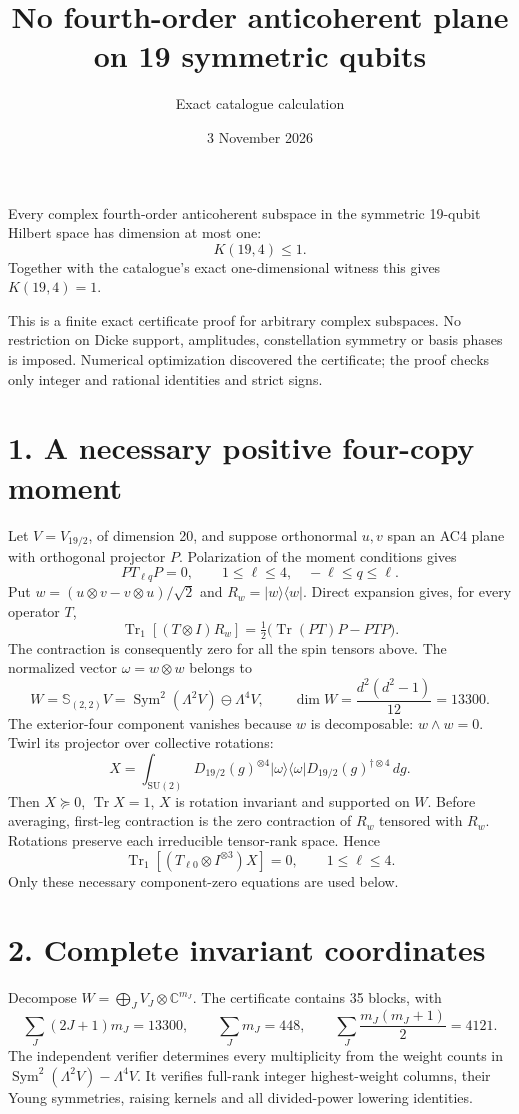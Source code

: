\documentclass[11pt]{article}
\newcommand{\Tr}{\operatorname{Tr}}\newcommand{\Sym}{\operatorname{Sym}}
\begin{document}
\title{No fourth-order anticoherent plane on 19 symmetric qubits}
\author{Exact catalogue calculation}\date{3 November 2026}\maketitle
\begin{theorem}
Every complex fourth-order anticoherent subspace in the symmetric 19-qubit Hilbert space has dimension at most one:
\[\boxed{K(19,4)\le1.}\]
Together with the catalogue's exact one-dimensional witness this gives $K(19,4)=1$.
\end{theorem}
This is a finite exact certificate proof for arbitrary complex subspaces. No restriction on Dicke support, amplitudes, constellation symmetry or basis phases is imposed. Numerical optimization discovered the certificate; the proof checks only integer and rational identities and strict signs.

\section*{1. A necessary positive four-copy moment}
Let $V=V_{19/2}$, of dimension 20, and suppose orthonormal $u,v$ span an AC4 plane with orthogonal projector $P$. Polarization of the moment conditions gives
\[PT_{\ell q}P=0,\qquad 1\le\ell\le4,\quad -\ell\le q\le\ell.\]
Put $w=(u\otimes v-v\otimes u)/\sqrt2$ and $R_w=|w\rangle\langle w|$. Direct expansion gives, for every operator $T$,
\[\Tr_1[(T\otimes I)R_w]=\tfrac12\bigl(\Tr(PT)P-PTP\bigr).\]
The contraction is consequently zero for all the spin tensors above. The normalized vector $\omega=w\otimes w$ belongs to
\[W=\mathbb S_{(2,2)}V=\Sym^2(\Lambda^2V)\ominus\Lambda^4V,\qquad \dim W=\frac{d^2(d^2-1)}{12}=13300.\]
The exterior-four component vanishes because $w$ is decomposable: $w\wedge w=0$. Twirl its projector over collective rotations:
\[X=\int_{\mathrm{SU}(2)}D_{19/2}(g)^{\otimes4}|\omega\rangle\langle\omega|D_{19/2}(g)^{\dagger\otimes4}\,dg.\]
Then $X\succeq0$, $\Tr X=1$, $X$ is rotation invariant and supported on $W$. Before averaging, first-leg contraction is the zero contraction of $R_w$ tensored with $R_w$. Rotations preserve each irreducible tensor-rank space. Hence
\begin{equation}\label{eq:zero}\Tr_1[(T_{\ell0}\otimes I^{\otimes3})X]=0,\qquad1\le\ell\le4.\end{equation}
Only these necessary component-zero equations are used below.

\section*{2. Complete invariant coordinates}
Decompose $W=\bigoplus_J V_J\otimes\mathbb C^{m_J}$. The certificate contains 35 blocks, with
\[\sum_J(2J+1)m_J=13300,\qquad\sum_Jm_J=448,\qquad\sum_J\frac{m_J(m_J+1)}2=4121.\]
The independent verifier determines every multiplicity from the weight counts in $\Sym^2(\Lambda^2V)-\Lambda^4V$. It verifies full-rank integer highest-weight columns, their Young symmetries, raising kernels and all divided-power lowering identities.
\end{document}
